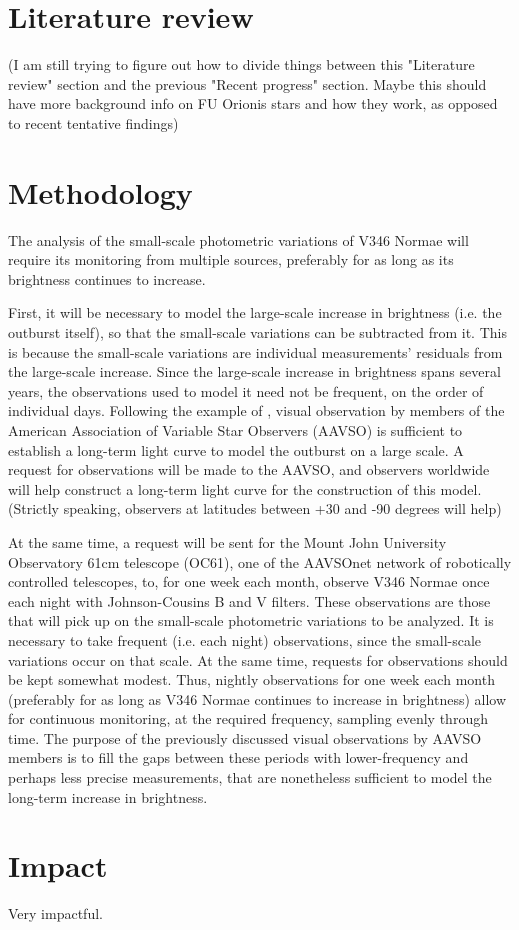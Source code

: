 \documentclass[iop,apj,tighten]{emulateapj}
\begin{document}
\section{Literature review}
(I am still trying to figure out how to divide things between this "Literature review" section and the previous "Recent progress" section. Maybe this should have more background info on FU Orionis stars and how they work, as opposed to recent tentative findings)

\section{Methodology}
The analysis of the small-scale photometric variations of V346 Normae will require its monitoring from multiple sources, preferably for as long as its brightness continues to increase. 

First, it will be necessary to model the large-scale increase in brightness (i.e. the outburst itself), so that the small-scale variations can be subtracted from it. This is because the small-scale variations are individual measurements' residuals from the large-scale increase. Since the large-scale increase in brightness spans several years, the observations used to model it need not be frequent, on the order of individual days. Following the example of \cite{kenyon_flickering_2000}, visual observation by members of the American Association of Variable Star Observers (AAVSO) is sufficient to establish a long-term light curve to model the outburst on a large scale. A request for observations will be made to the AAVSO, and observers worldwide will help construct a long-term light curve for the construction of this model. (Strictly speaking, observers at latitudes between +30 and -90 degrees will help)

At the same time, a request will be sent for the Mount John University Observatory 61cm telescope (OC61), one of the AAVSOnet network of robotically controlled telescopes, to, for one week each month, observe V346 Normae once each night with Johnson-Cousins B and V filters. These observations are those that will pick up on the small-scale photometric variations to be analyzed. It is necessary to take frequent (i.e. each night) observations, since the small-scale variations occur on that scale. At the same time, requests for observations should be kept somewhat modest. Thus, nightly observations  for one week each month (preferably for as long as V346 Normae continues to increase in brightness) allow for continuous monitoring, at the required frequency, sampling evenly through time. The purpose of the previously discussed visual observations by AAVSO members is to fill the gaps between these periods with lower-frequency and perhaps less precise measurements, that are nonetheless sufficient to model the long-term increase in brightness.

\section{Impact}
Very impactful.

\newpage



\end{document}
